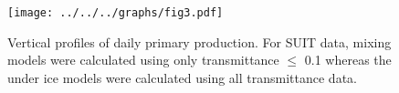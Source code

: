 \documentclass[12pt,a4paper]{scrartcl}
\begin{document}
\clearpage
\newpage

\begin{figure}[h]
	\centering
	\texttt{[image: ../../../graphs/fig3.pdf]}
	\caption{Vertical profiles of daily primary production. For SUIT data, mixing models were calculated using only transmittance $\le$ 0.1 whereas the under ice models were calculated using all transmittance data.}
\end{figure}

\clearpage
\newpage
\end{document}
